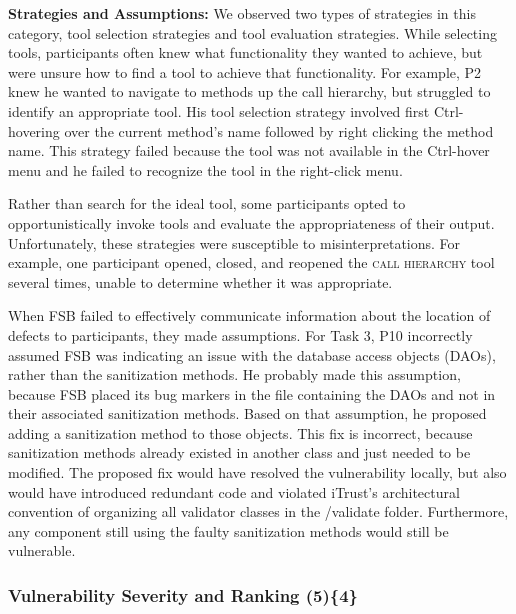 \documentclass[10pt,journal,compsoc]{IEEEtran}
\begin{document}
\textbf{Strategies and Assumptions:}
We observed two types of strategies in this category, tool selection strategies and tool evaluation strategies. 
While selecting tools, participants often knew what functionality they wanted to achieve, but were unsure how to find a tool to achieve that functionality. For example, P2 knew he wanted to navigate to methods up the call hierarchy, but struggled to identify an appropriate tool. 
His tool selection strategy involved first Ctrl-hovering over the current method's name followed by right clicking the method name.
This strategy failed because the tool was not available in the Ctrl-hover menu and he failed to recognize the tool in the right-click menu.

Rather than search for the ideal tool, some participants opted to opportunistically invoke tools and evaluate the appropriateness of their output. Unfortunately, these strategies were susceptible to misinterpretations. For example, one participant opened, closed, and reopened the \textsc{call hierarchy} tool several times, unable to determine whether it was appropriate. 

When FSB failed to effectively communicate information about the location of defects to participants, they made assumptions.
For Task 3, P10 incorrectly assumed FSB was indicating an issue with the database access objects (DAOs), rather than the sanitization methods.
He probably made this assumption, because FSB placed its bug markers in the file containing the DAOs and not in their associated sanitization methods. 
Based on that assumption, he proposed adding a sanitization method to those objects.
This fix is incorrect, because sanitization methods already existed in another class and just needed to be modified.
The proposed fix would have resolved the vulnerability locally, but also would have introduced redundant code and violated iTrust's architectural convention of organizing all validator classes in the /validate folder.
Furthermore, any component still using the faulty sanitization methods would still be vulnerable.




\subsubsection{Vulnerability Severity and Ranking (5)\{4\}}
\end{document}
